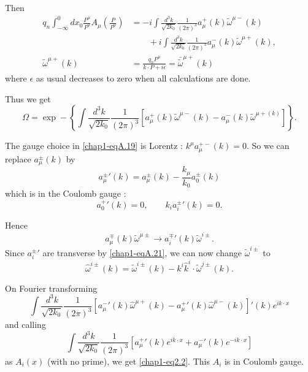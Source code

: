 Then
\begin{align*}
  q_n \int^0_{-\infty} dx_0 \frac{P^\mu}{P^0} A_\mu \left( \frac{P}{P^0}\right) & = -i \int \frac{d^3k}{\sqrt{2k_0}} \frac{1}{(2 \pi)^3} a_\mu^+ (k) \tilde{\omega}^{\mu -} (k)\\
  & \qquad + i \int \frac{d^3k}{\sqrt{2k_0}} \frac{1}{(2 \pi)^3} a_\mu^- (k) \tilde{\omega}^{\mu +}(k), \label{chap1-eqA.17}\tag{A.17}\\
  \tilde{\omega}^{\mu +} (k) & = \frac{q_n P^\mu}{k \cdot P + i\epsilon} = \bar{\tilde{\omega}}^{\mu +} (k) \label{chap1-eqA.18}\tag{A.18}
\end{align*}
where $\epsilon$ as usual decreases to zero when all calculations are done.

Thus we get
\begin{equation*}
\Omega = \exp - \left\{ \int \frac{d^3 k}{\sqrt{2k_0}} \frac{1}{(2 \pi)^3} \left[a_\mu^+ (k) \tilde{\omega}^{\mu -} (k) - a_\mu^- (k) \tilde{\omega}^{\mu + (k)} \right]\right\}. \label{chap1-eqA.19}\tag{A.19}
\end{equation*}

The gauge choice in \eqref{chap1-eqA.19} is Lorentz : $k^\mu a_\mu^{+ -} (k) =0$. So we can replace $a_\mu^{\pm} (k)$ by
\begin{equation*}
{a_\mu^{\pm}}' (k) = a_\mu^{\pm} (k) - \frac{k_\mu}{k_0} a_0^\pm (k) \label{chap1-eqA.20}\tag{A.20}
\end{equation*}
which is in the Coulomb gauge :
\begin{equation*}
  {a_0^{+}}' (k) =0, \qquad k_i {a_i^\pm} ' (k) =0. \label{chap1-eqA.21}\tag{A.21}
\end{equation*}

Hence
\begin{equation*}
a_\mu^{\mp} (k) \tilde{\omega}^{\mu \pm} \to {a_i^{\mp}}' (k) \tilde{\omega}^{i \pm}. \label{chap1-eqA.22}\tag{A.22}
\end{equation*}
Since ${a_i^{\pm}}'$ are transverse by \eqref{chap1-eqA.21}, we can now change $\tilde{\omega}^{i \pm }$ to
\begin{equation*}
\hat{\omega}^{i \pm} (k) = \tilde{\omega}^{i \pm} (k) - k^i \hat{k}^i \cdot \tilde{\omega}^{j \pm}(k). \label{chap1-eqA.23}\tag{A.23}
\end{equation*}

On Fourier transforming
\begin{equation*}
\int \frac{d^3k}{\sqrt{2k_0}} \frac{1}{(2 \pi)^3} \left[ {a_\mu^-}' (k) \hat{\omega}^{\mu +} (k) - {a_\mu^+}' (k) \hat{\omega}^{\mu -} (k)\right]' (k) e^{ik \cdot x} \label{chap1-eqA.24}\tag{A.24}
\end{equation*}
and calling
\begin{equation*}
\int \frac{d^3k}{\sqrt{2k_0}} \frac{1}{(2 \pi)^3} \left[ {a_\mu^+}' (k) e^{ik \cdot x} + {a_\mu^-}' (k) e^{-i k \cdot x}\right] \label{chap1-eqA.25}\tag{A.25}
\end{equation*}
as $A_i (x)$ (with no prime), we get \eqref{chap1-eq2.2}. This $A_i$ is in Coulomb gauge.


